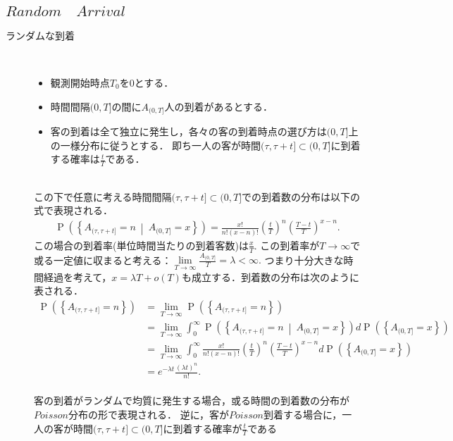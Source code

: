 \documentclass[a4j,papersize,disablejfam,slide,14pt]{jsarticle}
\def\exp#1{e^{#1}} %
\def\prob#1{\operatorname{P} \left(\left\{ #1 \right\}\right)} %
\def\cprob#1#2{\operatorname{P} \left(\left\{ #1 \ \middle|\ #2 \right\}\right)} %
\begin{document}
\subsection{$Random\quad Arrival$}
    \begin{description}
    	\item[ランダムな到着]\mbox{}\\
        	\begin{itemize}
    			\item 観測開始時点$T_0$を$0$とする．
        		\item 時間間隔$(0, T]$の間に$A_{(0, T]}$人の到着があるとする．
        		\item 客の到着は全て独立に発生し，各々の客の到着時点の選び方は$(0, T]$上の一様分布に従うとする．
                即ち一人の客が時間$(\tau, \tau + t] \subset (0, T]$に到着する確率は$\frac{t}{T}$である．
            \end{itemize}
            \mbox{}\\
        	この下で任意に考える時間間隔$(\tau, \tau + t] \subset (0, T]$での到着数の分布は以下の式で表現される．
        	\begin{align}
        		\cprob{A_{(\tau, \tau + t]} = n}{A_{(0, T]}=x} = \frac{x!}{n!(x-n)!} \left( \frac{t}{T} \right)^n \left( \frac{T-t}{T} \right)^{x-n}.
        	\end{align}
        	この場合の到着率(単位時間当たりの到着客数)は$\frac{x}{T}$.
        	この到着率が$T \to \infty$で或る一定値に収まると考える：$\lim\limits_{T \to \infty} \frac{A_{(0, T]}}{T} = \lambda < \infty.$
        	つまり十分大きな時間経過を考えて，$x = \lambda T + o(T)$も成立する．到着数の分布は次のように表される．
        	\begin{align}
        		\prob{A_{(\tau, \tau + t]} = n} &= \lim_{T \to \infty} \prob{A_{(\tau, \tau + t]} = n} \\
                &= \lim_{T \to \infty} \int_{0}^{\infty} \cprob{A_{(\tau, \tau + t]} = n}{A_{(0, T]}=x} d\prob{A_{(0, T]}=x} \\
                &= \lim_{T \to \infty} \int_{0}^{\infty} \frac{x!}{n!(x-n)!} \left( \frac{t}{T} \right)^n \left( \frac{T-t}{T} \right)^{x-n} d\prob{A_{(0, T]}=x} \\
            	&= \exp{-\lambda t} \frac{(\lambda t)^n}{n!}.
        	\end{align}
            \mbox{}\\
            客の到着がランダムで均質に発生する場合，或る時間の到着数の分布が$Poisson$分布の形で表現される．
            逆に，客が$Poisson$到着する場合に，一人の客が時間$(\tau, \tau + t] \subset (0, T]$に到着する確率が$\frac{t}{T}$である

\end{description}
\end{document}

